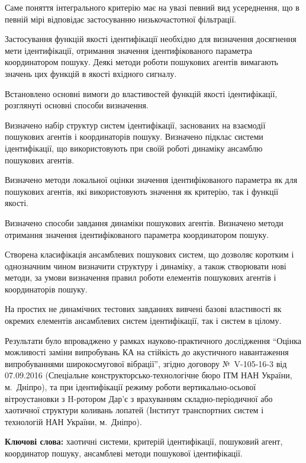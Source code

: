     Саме поняття інтегрального критерію має на увазі певний
    вид усереднення, що в певній мірі відповідає застосуванню
    низькочастотної фільтрації.

    Застосування функцій якості ідентифікації необхідно для
    визначення досягнення мети ідентифікації, отримання значення
    ідентифікованого параметра координатором пошуку. Деякі методи
    роботи пошукових агентів вимагають значень цих функцій в якості
    вхідного сигналу.

    Встановлено основні вимоги до властивостей функцій якості
    ідентифікації, розглянуті основні способи визначення.

    Визначено набір структур систем ідентифікації, заснованих на
    взаємодії пошукових агентів і координаторів пошуку. Визначено
    підклас системи ідентифікації, що використовують при своїй
    роботі динаміку ансамблю пошукових агентів.

    Визначено методи локальної оцінки значення ідентифікованого
    параметра як для пошукових агентів, які використовують значення
    як критерію, так і функції якості.

    Визначено способи завдання динаміки пошукових агентів.
    Визначено методи отримання значення ідентифікованого параметра
    координатором пошуку.

    Створена класифікація ансамблевих пошукових систем, що дозволяє
    коротким і однозначним чином визначити структуру і динаміку,
    а також створювати нові методи, за умови визначення правил
    роботи елементів пошукових агентів і координаторів пошуку.

    На простих не динамічних тестових завданнях вивчені базові
    властивості як окремих елементів ансамблевих систем
    ідентифікації, так і систем в цілому.

Результати було впроваджено у рамках науково-практичного дослідження
``Оцінка можливості заміни випробувань КА на стійкість до акустичного навантаження
випробуваннями широкосмугової вібрації'', згідно договору \hbox{№~V-105-16-3} від 07.09.2016
(Спеціальне конструкторсько-технологічне бюро ІТМ НАН України, м.~Дніпро),
та при ідентифікації режиму роботи вертикально-осьової вітроустановки з H-ротором Дар'є
з врахуванням складно-періодичної або хаотичної структури коливань лопатей
(Інститут транспортних систем і технологій НАН України, м.~Дніпро).

\textbf{Ключові слова:}
хаотичні системи,
критерій ідентифікації,
пошуковий агент,
координатор пошуку,
ансамблеві методи пошукової ідентифікації.






